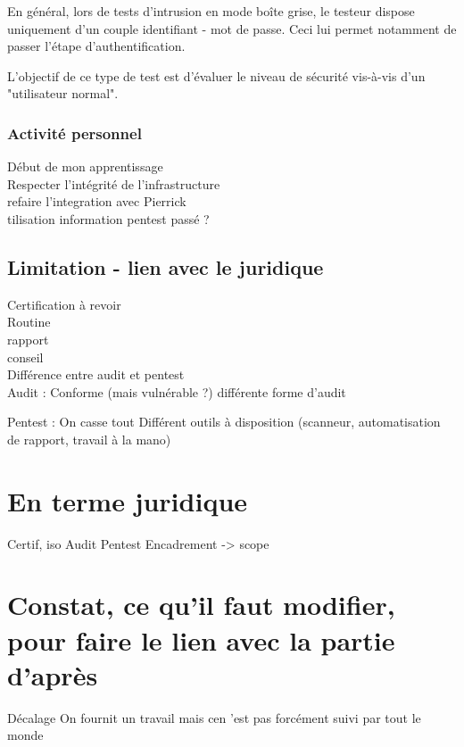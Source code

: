\documentclass[a4paper]{memoir}
\begin{document}
En général, lors de tests d'intrusion en mode boîte grise, le testeur dispose uniquement d'un couple identifiant - mot de passe. Ceci lui permet notamment de passer l'étape d'authentification.

L'objectif de ce type de test est d'évaluer le niveau de sécurité vis-à-vis d'un "utilisateur normal".

\subsection{Activité personnel}

Début de mon apprentissage\\
Respecter l'intégrité de l'infrastructure\\

refaire l'integration avec Pierrick\\
tilisation information pentest passé ?\\

\section{Limitation - lien avec le juridique}

Certification à revoir\\

  
Routine\\
rapport\\
conseil\\

Différence entre audit et pentest\\

Audit : Conforme (mais vulnérable ?)
différente forme d'audit


Pentest : On casse tout
Différent outils à disposition
(scanneur, automatisation de rapport, travail à la mano)

\chapter{En terme juridique}

Certif, iso
Audit
Pentest
Encadrement -> scope

\chapter{Constat, ce qu'il faut modifier, pour faire le lien avec la partie d'après}

Décalage
On fournit un travail mais cen 'est pas forcément suivi par tout le monde 
\end{document}
